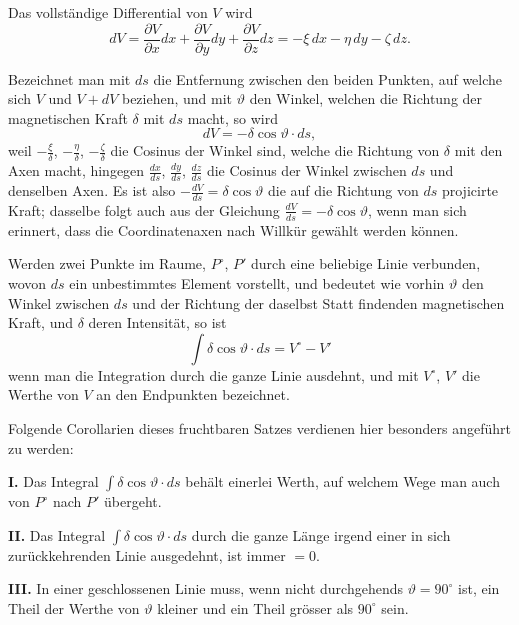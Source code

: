 \documentclass[fontsize=11pt,paper=a4,twoside,openany]{scrbook}
\begin{document}
Das vollständige Differential von $V$ wird
\[
dV = \frac{\partial V}{\partial x}dx + \frac{\partial V}{\partial y}dy + \frac{\partial V}{\partial z}dz = -\xi\,dx - \eta\,dy - \zeta\,dz.
\]

Bezeichnet man mit $ds$ die Entfernung zwischen den beiden Punkten, auf welche sich $V$ und $V+dV$ beziehen, und mit $\vartheta$ den Winkel, welchen die Richtung der magnetischen Kraft $\delta$ mit $ds$ macht, so wird
\[
dV = -\delta\cos\vartheta\cdot ds,
\]
weil $-\frac{\xi}{\delta}$, $-\frac{\eta}{\delta}$, $-\frac{\zeta}{\delta}$ die Cosinus der Winkel sind, welche die Richtung von $\delta$ mit den Axen macht, hingegen $\frac{dx}{ds}$, $\frac{dy}{ds}$, $\frac{dz}{ds}$ die Cosinus der Winkel zwischen $ds$ und denselben Axen. Es ist also $-\frac{dV}{ds}=\delta\cos\vartheta$ die auf die Richtung von $ds$ projicirte Kraft; dasselbe folgt auch aus der Gleichung $\frac{dV}{ds}=-\delta\cos\vartheta$, wenn man sich erinnert, dass die Coordinatenaxen nach Willkür gewählt werden können.

Werden zwei Punkte im Raume, $P^{\circ}$, $P'$ durch eine beliebige Linie verbunden, wovon $ds$ ein unbestimmtes Element vorstellt, und bedeutet wie vorhin $\vartheta$ den Winkel zwischen $ds$ und der Richtung der daselbst Statt findenden magnetischen Kraft, und $\delta$ deren Intensität, so ist
\[
\int\delta\cos\vartheta\cdot ds = V^{\circ} - V'
\]
wenn man die Integration durch die ganze Linie ausdehnt, und mit $V^{\circ}$, $V'$ die Werthe von $V$ an den Endpunkten bezeichnet.

Folgende Corollarien dieses fruchtbaren Satzes verdienen hier besonders angeführt zu werden:

\textbf{I.} Das Integral $\int\delta\cos\vartheta\cdot ds$ behält einerlei Werth, auf welchem Wege man auch von $P^{\circ}$ nach $P'$ übergeht.

\textbf{II.} Das Integral $\int\delta\cos\vartheta\cdot ds$ durch die ganze Länge irgend einer in sich zurückkehrenden Linie ausgedehnt, ist immer $=0$.

\textbf{III.} In einer geschlossenen Linie muss, wenn nicht durchgehends $\vartheta=90^{\circ}$ ist, ein Theil der Werthe von $\vartheta$ kleiner und ein Theil grösser als $90^{\circ}$ sein.

\section{}
\end{document}
